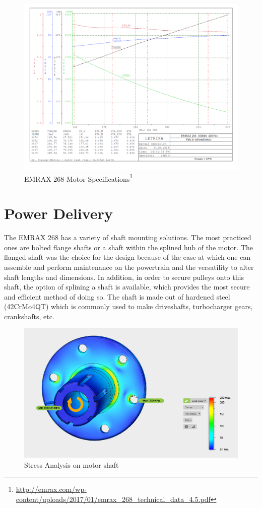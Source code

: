 \documentclass[main.tex]{subfiles}
\begin{document}
    \begin{figure}[H]
        \centering
        \includegraphics[width=\linewidth]{images/fig11}
        \caption{EMRAX 268 Motor Specifications\protect\footnote{\url{http://emrax.com/wp-content/uploads/2017/01/emrax_268_technical_data_4.5.pdf}}}
    \end{figure}

    \section{Power Delivery}
    The EMRAX 268 has a variety of shaft mounting solutions. The most practiced ones are bolted flange shafts or a shaft within the splined hub of the motor. The flanged shaft was the choice for the design because of the ease at which one can assemble and perform maintenance on the powertrain and the versatility to alter shaft lengths and dimensions. In addition, in order to secure pulleys onto this shaft, the option of splining a shaft is available, which provides the most secure and efficient method of doing so. The shaft is made out of hardened steel (42CrMo4QT) which is commonly used to make driveshafts, turbocharger gears, crankshafts, etc.\\

    \begin{figure}[H]
        \centering
        \includegraphics[width=\linewidth]{images/fig12}
        \caption{Stress Analysis on motor shaft}
    \end{figure}
\end{document}

